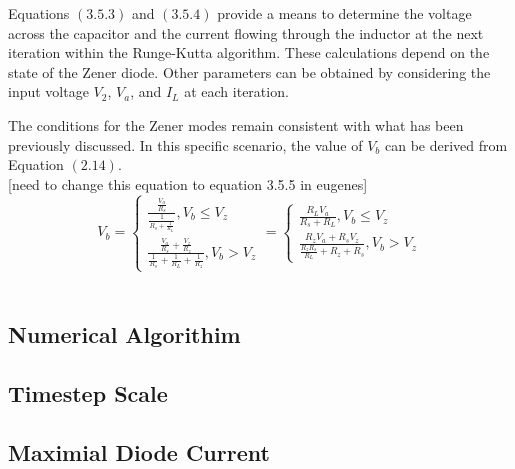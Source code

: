 Equations $(3.5.3)$ and $(3.5.4)$ provide a means to determine the voltage across the capacitor and the current flowing through the inductor at the next iteration within the Runge-Kutta algorithm. These calculations depend on the state of the Zener diode. Other parameters can be obtained by considering the input voltage $V_2$, $V_a$, and $I_L$ at each iteration.

The conditions for the Zener modes remain consistent with what has been previously discussed. In this specific scenario, the value of $V_b$ can be derived from Equation $(2.14)$.\\


[need to change this equation to equation 3.5.5 in eugenes]
\begin{equation}
    V_b=\begin{cases}
        \frac{\frac{V_a}{R_s}}{\frac{1}{R_s+\frac{1}{R_L}}}, V_b \leq V_z\\
        \frac{\frac{V_a}{R_s}+\frac{V_z}{R_z}}{\frac{1}{R_s}+\frac{1}{R_L}+\frac{1}{R_z}}, V_b>V_z
    \end{cases}=\begin{cases}
        \frac{R_LV_a}{R_s+R_L}, V_b \leq V_z\\
        \frac{R_zV_a+R_sV_z}{\frac{R_zR_s}{R_L}+R_z+R_s}, V_b>V_z
    \end{cases}
\end{equation}\\















\subsection{Numerical Algorithim}
\subsection{Timestep Scale}
\subsection{Maximial Diode Current}